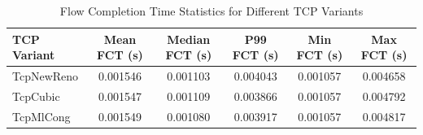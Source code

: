 \begin{table}[h]
\centering
\begin{tabular}{|l|c|c|c|c|c|}
\hline
TCP Variant & Mean FCT (s) & Median FCT (s) & P99 FCT (s) & Min FCT (s) & Max FCT (s) \\
\hline
TcpNewReno & 0.001546 & 0.001103 & 0.004043 & 0.001057 & 0.004658 \\
TcpCubic & 0.001547 & 0.001109 & 0.003866 & 0.001057 & 0.004792 \\
TcpMlCong & 0.001549 & 0.001080 & 0.003917 & 0.001057 & 0.004817 \\
\hline
\end{tabular}
\caption{Flow Completion Time Statistics for Different TCP Variants}
\label{tab:fct_stats}
\end{table}
